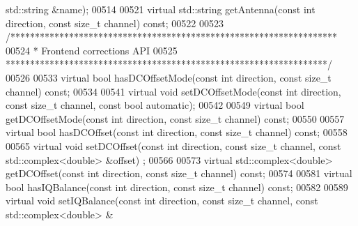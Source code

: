 \begin{DoxyCode}
      std::string &name);
00514 
00521     \textcolor{keyword}{virtual} std::string getAntenna(\textcolor{keyword}{const} \textcolor{keywordtype}{int} direction, \textcolor{keyword}{const} \textcolor{keywordtype}{size\_t} channel) \textcolor{keyword}{const};
00522 
00523     \textcolor{comment}{/*******************************************************************}
00524 \textcolor{comment}{     * Frontend corrections API}
00525 \textcolor{comment}{     ******************************************************************/}
00526 
00533     \textcolor{keyword}{virtual} \textcolor{keywordtype}{bool} hasDCOffsetMode(\textcolor{keyword}{const} \textcolor{keywordtype}{int} direction, \textcolor{keyword}{const} \textcolor{keywordtype}{size\_t} channel) \textcolor{keyword}{const};
00534 
00541     \textcolor{keyword}{virtual} \textcolor{keywordtype}{void} setDCOffsetMode(\textcolor{keyword}{const} \textcolor{keywordtype}{int} direction, \textcolor{keyword}{const} \textcolor{keywordtype}{size\_t} channel, \textcolor{keyword}{const} \textcolor{keywordtype}{bool} automatic);
00542 
00549     \textcolor{keyword}{virtual} \textcolor{keywordtype}{bool} getDCOffsetMode(\textcolor{keyword}{const} \textcolor{keywordtype}{int} direction, \textcolor{keyword}{const} \textcolor{keywordtype}{size\_t} channel) \textcolor{keyword}{const};
00550 
00557     \textcolor{keyword}{virtual} \textcolor{keywordtype}{bool} hasDCOffset(\textcolor{keyword}{const} \textcolor{keywordtype}{int} direction, \textcolor{keyword}{const} \textcolor{keywordtype}{size\_t} channel) \textcolor{keyword}{const};
00558 
00565     \textcolor{keyword}{virtual} \textcolor{keywordtype}{void} setDCOffset(\textcolor{keyword}{const} \textcolor{keywordtype}{int} direction, \textcolor{keyword}{const} \textcolor{keywordtype}{size\_t} channel, \textcolor{keyword}{const} std::complex<double> &offset)
      ;
00566 
00573     \textcolor{keyword}{virtual} std::complex<double> getDCOffset(\textcolor{keyword}{const} \textcolor{keywordtype}{int} direction, \textcolor{keyword}{const} \textcolor{keywordtype}{size\_t} channel) \textcolor{keyword}{const};
00574 
00581     \textcolor{keyword}{virtual} \textcolor{keywordtype}{bool} hasIQBalance(\textcolor{keyword}{const} \textcolor{keywordtype}{int} direction, \textcolor{keyword}{const} \textcolor{keywordtype}{size\_t} channel) \textcolor{keyword}{const};
00582 
00589     \textcolor{keyword}{virtual} \textcolor{keywordtype}{void} setIQBalance(\textcolor{keyword}{const} \textcolor{keywordtype}{int} direction, \textcolor{keyword}{const} \textcolor{keywordtype}{size\_t} channel, \textcolor{keyword}{const} std::complex<double> &

\end{DoxyCode}
